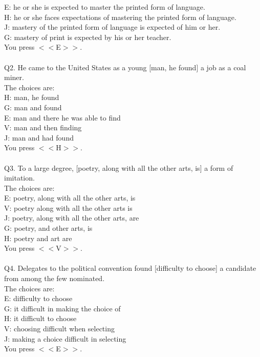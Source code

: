 \documentclass[pdflatex,sn-nature]{sn-jnl}%
\theoremstyle{thmstyleone}%
\theoremstyle{thmstyletwo}%
\theoremstyle{thmstylethree}%
\begin{document}
E: he or she is expected to master the printed form of language. $~$\\ 
H: he or she faces expectations of mastering the printed form of language. $~$\\ 
J: mastery of the printed form of language is expected of him or her. $~$\\ 
G: mastery of print is expected by his or her teacher. $~$\\ 
You press $<<$E$>>$. $~$\\ 
 $~$\\ 
Q2. He came to the United States as a young [man, he found] a job as a coal miner. $~$\\ 
The choices are: $~$\\ 
H: man, he found $~$\\ 
G: man and found $~$\\ 
E: man and there he was able to find $~$\\ 
V: man and then finding $~$\\ 
J: man and had found $~$\\ 
You press $<<$H$>>$. $~$\\ 
 $~$\\ 
Q3. To a large degree, [poetry, along with all the other arts, is] a form of imitation. $~$\\ 
The choices are: $~$\\ 
E: poetry, along with all the other arts, is $~$\\ 
V: poetry along with all the other arts is $~$\\ 
J: poetry, along with all the other arts, are $~$\\ 
G: poetry, and other arts, is $~$\\ 
H: poetry and art are $~$\\ 
You press $<<$V$>>$. $~$\\ 
 $~$\\ 
Q4. Delegates to the political convention found [difficulty to choose] a candidate from among the few nominated. $~$\\ 
The choices are: $~$\\ 
E: difficulty to choose $~$\\ 
G: it difficult in making the choice of $~$\\ 
H: it difficult to choose $~$\\ 
V: choosing difficult when selecting $~$\\ 
J: making a choice difficult in selecting $~$\\ 
You press $<<$E$>>$. $~$\\ 
\end{document}
